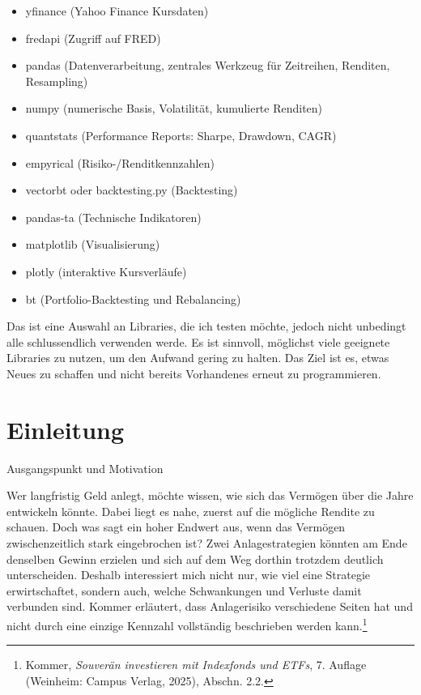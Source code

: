\documentclass[
  ngerman,
  a4paper,
  DIV=11,
  oneside]{scrreprt}
\providecommand{\tightlist}{%
  \setlength{\itemsep}{0pt}\setlength{\parskip}{0pt}}
\begin{document}
\begin{itemize}
\tightlist
\item
  yfinance (Yahoo Finance Kursdaten)
\item
  fredapi (Zugriff auf FRED)
\item
  pandas (Datenverarbeitung, zentrales Werkzeug für Zeitreihen,
  Renditen, Resampling)
\item
  numpy (numerische Basis, Volatilität, kumulierte Renditen)
\item
  quantstats (Performance Reports: Sharpe, Drawdown, CAGR)
\item
  empyrical (Risiko-/Renditkennzahlen)
\item
  vectorbt oder backtesting.py (Backtesting)
\item
  pandas-ta (Technische Indikatoren)
\item
  matplotlib (Visualisierung)
\item
  plotly (interaktive Kursverläufe)
\item
  bt (Portfolio-Backtesting und Rebalancing)
\end{itemize}

Das ist eine Auswahl an Libraries, die ich testen möchte, jedoch nicht
unbedingt alle schlussendlich verwenden werde. Es ist sinnvoll,
möglichst viele geeignete Libraries zu nutzen, um den Aufwand gering zu
halten. Das Ziel ist es, etwas Neues zu schaffen und nicht bereits
Vorhandenes erneut zu programmieren.


\chapter{Einleitung}\label{einleitung}

Ausgangspunkt und Motivation

Wer langfristig Geld anlegt, möchte wissen, wie sich das Vermögen über
die Jahre entwickeln könnte. Dabei liegt es nahe, zuerst auf die
mögliche Rendite zu schauen. Doch was sagt ein hoher Endwert aus, wenn
das Vermögen zwischenzeitlich stark eingebrochen ist? Zwei
Anlagestrategien könnten am Ende denselben Gewinn erzielen und sich auf
dem Weg dorthin trotzdem deutlich unterscheiden. Deshalb interessiert
mich nicht nur, wie viel eine Strategie erwirtschaftet, sondern auch,
welche Schwankungen und Verluste damit verbunden sind. Kommer erläutert,
dass Anlagerisiko verschiedene Seiten hat und nicht durch eine einzige
Kennzahl vollständig beschrieben werden kann.\footnote{Kommer,
  \emph{Souverän investieren mit Indexfonds und ETFs}, 7. Auflage
  (Weinheim: Campus Verlag, 2025), Abschn. 2.2.}
\end{document}
